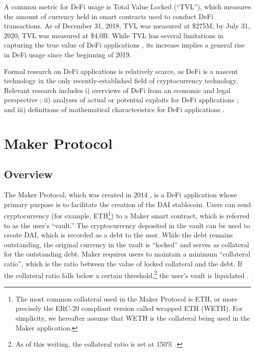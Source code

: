 \documentclass[conference]{IEEEtran}
\begin{document}
A common metric for DeFi usage is Total Value Locked (``TVL''), which measures the amount of currency held in smart contracts used to conduct DeFi transactions. As of December 31, 2018, TVL was measured at \$275M; by July 31, 2020, TVL was measured at \$4.0B\cite{defiPulse}. While TVL has several limitations in capturing the true value of DeFi applications \cite{etoro, consensys.Q2Defi}, its increase implies a general rise in DeFi usage since the beginning of 2019.

Formal research on DeFi applications is relatively scarce, as DeFi is a nascent technology in the only recently-established field of cryptocurrency technology. Relevant research includes i) overviews of DeFi from an economic and legal perspective \cite{defiOverview1, defiOverview2}; ii) analyses of actual or potential exploits for DeFi applications \cite{exploit1, exploit2}; and iii) definitions of mathematical characteristics for DeFi applications \cite{defiMath1, defiMath2}.

\section{Maker Protocol}
\label{sec:maker}
\subsection{Overview}
The Maker Protocol, which was created in 2014 \cite{makerWhitePaper}, is a DeFi application whose primary purpose is to facilitate the creation of the DAI stablecoin. Users can send cryptocurrency (for example, ETH\footnote{The most common collateral used in the Maker Protocol is ETH, or more precisely the ERC-20 compliant version called wrapped ETH (WETH). For simplicity, we hereafter assume that WETH is the collateral being used in the Maker application.}) to a Maker smart contract, which is referred to as the user's ``vault.'' The cryptocurrency deposited in the vault can be used to create DAI, which is recorded as a debt to the user. While the debt remains outstanding, the original currency in the vault is ``locked'' and serves as collateral for the outstanding debt. Maker requires users to maintain a minimum ``collateral ratio'', which is the ratio between the value of locked collateral and the debt. If the collateral ratio falls below a certain threshold,\footnote{As of this writing, the collateral ratio is set at 150\% \cite{oasis}.} the user's vault is liquidated \cite{makerAuctions}.
\end{document}
